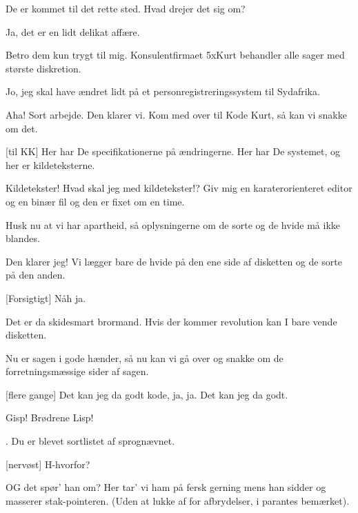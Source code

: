 \documentclass[a4paper,11pt]{article}
\begin{document}
\begin{sketch}
 De er kommet til det rette sted. Hvad drejer det sig om?

 Ja, det er en lidt delikat affære.

 Betro dem kun trygt til mig. Konsulentfirmaet 5xKurt behandler alle
sager med største diskretion.

 Jo, jeg skal have ændret lidt på et personregistreringssystem
 til Sydafrika.

 Aha! Sort arbejde. Den klarer vi. Kom med over til Kode Kurt, så kan
vi snakke om det.


[til KK] Her har De specifikationerne på ændringerne. Her har De
systemet, og her er kildeteksterne.

 Kildetekster! Hvad skal jeg med kildetekster!? Giv mig en
karaterorienteret editor og en binær fil og den er fixet om en time.

 Husk nu at vi har apartheid, så oplysningerne om de sorte og de hvide
må ikke blandes.

 Den klarer jeg! Vi lægger bare de hvide på den ene side af disketten
og de sorte på den anden.

[Forsigtigt] Nåh ja.

 Det er da skidesmart brormand. Hvis der kommer revolution kan I bare
vende disketten.

 Nu er sagen i gode hænder, så nu kan vi gå over og snakke om de
forretningsmæssige sider af sagen.


[flere gange] Det kan jeg da godt kode, ja, ja. Det kan jeg da godt.


 Gisp! Brødrene Lisp!

 . Du er blevet
sortlistet af sprognævnet.

[nervøst] H-hvorfor?

 OG det spør' han om? Her tar' vi ham på fersk gerning mens han sidder
og masserer stak-pointeren. (Uden at lukke af for afbrydelser, i parantes
bemærket).


\end{sketch}
\end{document}
